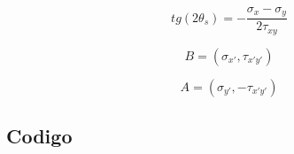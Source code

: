 \documentclass[a4paper]{article}
\begin{document}
		\begin{equation}
			tg(2\theta_s) = - \frac{\sigma_x - \sigma_y}{2\tau_{xy}}
		\end{equation}

		\begin{equation}
			B = (\sigma_{x'}, \tau_{x'y'})
		\end{equation}

		\begin{equation}
			A = (\sigma_{y'}, -\tau_{x'y'})
		\end{equation} 


\label{subsec: Codigo}

\subsection{Codigo}
\end{document}
